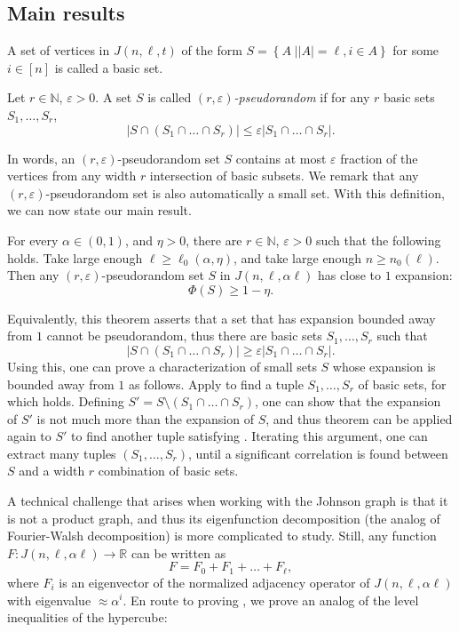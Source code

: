 \documentclass{toc}
\newcommand\card[1]{\left| {#1} \right|}
\newcommand\sett[2]{\left\{ \left. #1 \;\right\vert #2 \right\}}
\newcommand\skipi{{\vskip 10pt}}
\newcommand\eps{\varepsilon}
\renewcommand\geq{\geqslant}
\renewcommand\leq{\leqslant}
\begin{document}
\subsection{Main results}
A set of vertices in $J(n,\ell,t)$ of the form $S = \sett{A}{\card{A} = \ell, i\in A}$ for some $i\in [n]$ is called a
basic set.
\begin{definition}
  Let $r\in\mathbb{N}$, $\eps>0$. A set $S$ is called \emph{$(r,\eps)$-pseudorandom} if for any $r$ basic sets $S_1,\ldots,S_r$, %
  \[
   \card{S\cap (S_1\cap\ldots\cap S_r)}\leq \eps \card{S_1\cap\ldots\cap S_r}.
  \]
\end{definition}
In words, an $(r,\eps)$-pseudorandom set $S$ contains at most $\eps$ fraction of the vertices from any width $r$ intersection of basic subsets. We remark
that any $(r,\eps)$-pseudorandom set is also automatically a small set.
With this definition, we can now state our main result.
\begin{theorem}\label{thm:main_intro}
  For every $\alpha\in (0,1)$, and $\eta>0$, there are $r\in\mathbb{N}$, $\eps>0$ such that the following holds.
  Take large enough $\ell\geq\ell_0(\alpha,\eta)$, and take large enough $n\geq n_0(\ell)$. Then any $(r,\eps)$-pseudorandom set
  $S$ in $J(n,\ell,\alpha \ell)$ has close to $1$ expansion:
  \[
   \Phi(S)\geq 1-\eta.
  \]
\end{theorem}
Equivalently, this theorem asserts that a set that has expansion bounded away from $1$ cannot be pseudorandom, thus
there are basic sets %
$S_1,\ldots,S_r$ such that
\begin{equation}\label{eq:intro1}
 \card{S\cap(S_1\cap\ldots\cap S_r)}\geq \eps \card{S_1\cap\ldots\cap S_r}.
\end{equation}
Using this, one can prove a characterization of small sets $S$ whose expansion is bounded away from $1$ as follows.
Apply  to find a tuple $S_1,\ldots,S_r$ of basic sets, for which  holds.
Defining $S' = S\setminus (S_1\cap\ldots \cap S_r)$, one can show that the expansion of $S'$ is not much more than the expansion of $S$, and thus theorem can be applied
again to $S'$ to find another tuple satisfying .
Iterating this argument, one can extract many tuples $(S_1,\ldots,S_r)$, until a significant correlation is found between $S$ and a width $r$ combination
of basic sets.

\skipi

A technical challenge that arises when working with the Johnson graph %
is that it is not a product graph, and thus its eigenfunction decomposition (the analog
of Fourier-Walsh decomposition) is more complicated to study. Still, any function $F\colon J(n,\ell,\alpha \ell)\to\mathbb{R}$ can be written as
\begin{equation}\label{eq:intro''}
F = F_0+F_1+\ldots+F_{\ell},
\end{equation}
where $F_i$ is an eigenvector of the normalized adjacency operator of $J(n,\ell,\alpha\ell)$ with eigenvalue $\approx \alpha^i$.
En route to proving , we prove an analog of the level inequalities of the hypercube:
\end{document}
